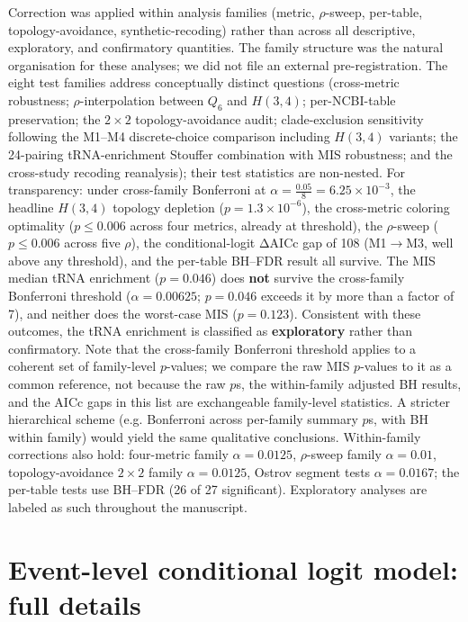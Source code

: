 \documentclass[preprint,11pt,authoryear,a4paper]{elsarticle}
\begin{document}
Correction was applied within analysis families (metric, \(\rho\)-sweep,
per-table, topology-avoidance, synthetic-recoding) rather than across
all descriptive, exploratory, and confirmatory quantities. The family
structure was the natural organisation for these analyses; we did not
file an external pre-registration. The eight test families address
conceptually distinct questions (cross-metric robustness;
\(\rho\)-interpolation between \(Q_{6}\) and \(H(3,4)\); per-NCBI-table
preservation; the \(2 \times 2\) topology-avoidance audit;
clade-exclusion sensitivity following \citep{sengupta2007} the M1--M4
discrete-choice comparison including \(H(3,4)\) variants; the 24-pairing
tRNA-enrichment Stouffer combination with MIS robustness; and the
cross-study recoding reanalysis); their test statistics are non-nested.
For transparency: under cross-family Bonferroni at
\(\alpha = \frac{0.05}{8} = 6.25 \times 10^{- 3}\), the headline
\(H(3,4)\) topology depletion (\(p = 1.3 \times 10^{- 6}\)), the
cross-metric coloring optimality (\(p \leq 0.006\) across four metrics,
already at threshold), the \(\rho\)-sweep (\(p \leq 0.006\) across five
\(\rho\)), the conditional-logit ΔAICc gap of 108 (M1\(\rightarrow\)M3,
well above any threshold), and the per-table BH--FDR result all survive.
The MIS median tRNA enrichment (\(p = 0.046\)) does \textbf{not} survive
the cross-family Bonferroni threshold (\(\alpha = 0.00625\);
\(p = 0.046\) exceeds it by more than a factor of 7), and neither does
the worst-case MIS (\(p = 0.123\)). Consistent with these outcomes, the
tRNA enrichment is classified as \textbf{exploratory} rather than
confirmatory. Note that the cross-family Bonferroni threshold applies to
a coherent set of family-level \(p\)-values; we compare the raw MIS
\(p\)-values to it as a common reference, not because the raw \(p\)s,
the within-family adjusted BH results, and the AICc gaps in this list
are exchangeable family-level statistics. A stricter hierarchical scheme
(e.g. Bonferroni across per-family summary \(p\)s, with BH within
family) would yield the same qualitative conclusions. Within-family
corrections also hold: four-metric family \(\alpha = 0.0125\),
\(\rho\)-sweep family \(\alpha = 0.01\), topology-avoidance
\(2 \times 2\) family \(\alpha = 0.0125\), Ostrov segment tests
\(\alpha = 0.0167\); the per-table tests use BH--FDR (26 of 27
significant). Exploratory analyses are labeled as such throughout the
manuscript.

\section{Event-level conditional logit model: full
details}\label{sec:s-condlogit}
\end{document}
